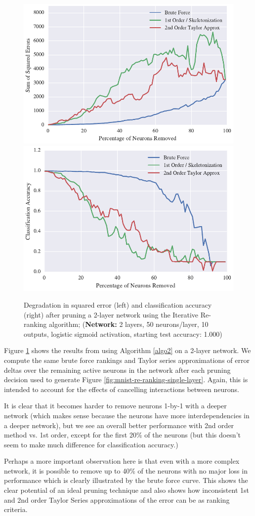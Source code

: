 \begin{figure}[!hb]
\centering
\includegraphics[width=0.49\linewidth]{png/mnist-deep-iterative-rerank-method.pdf}
\includegraphics[width=0.49\linewidth]{png/mnist-deep-iterative-rerank-accuracy.pdf}
\caption{Degradation in squared error (left) and classification accuracy (right) after pruning a 2-layer network using the Iterative Re-ranking algorithm; (\textbf{Network:} 2 layers, 50 neurons/layer, 10 outputs, logistic sigmoid activation, starting test accuracy: 1.000)}
\label{fig:mnist-re-ranking-double-layer}
\end{figure}

Figure \ref{fig:mnist-re-ranking-double-layer} shows the results from using Algorithm \ref{algo2} on a 2-layer network. We compute the same brute force rankings and Taylor series approximations of error deltas over the remaining active neurons in the network after each pruning decision used to generate Figure \ref{fig:mnist-re-ranking-single-layer}. Again, this is intended to account for the effects of cancelling interactions between neurons. 

It is clear that it becomes harder to remove neurons 1-by-1 with a deeper network (which makes sense because the neurons have more interdependencies in a deeper network), but we see an overall better performance with 2nd order method vs. 1st order, except for the first 20\% of the neurons (but this doesn't seem to make much difference for classification accuracy.) 

Perhaps a more important observation here is that even with a more complex network, it is possible to remove up to 40\% of the neurons with no major loss in performance which is clearly illustrated by the brute force curve. This shows the clear potential of an ideal pruning technique and also shows how inconsistent 1st and 2nd order Taylor Series approximations of the error can be as ranking criteria.

